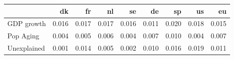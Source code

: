 \begin{tabular}{lrrrrrrrr}
\toprule
{} &     dk &     fr &     nl &     se &     de &     sp &     us &     eu \\
\midrule
GDP growth  &  0.016 &  0.017 &  0.017 &  0.016 &  0.011 &  0.020 &  0.018 &  0.015 \\
Pop Aging   &  0.004 &  0.005 &  0.006 &  0.004 &  0.007 &  0.010 &  0.004 &  0.007 \\
Unexplained &  0.001 &  0.014 &  0.005 &  0.002 &  0.010 &  0.016 &  0.019 &  0.011 \\
\bottomrule
\end{tabular}

